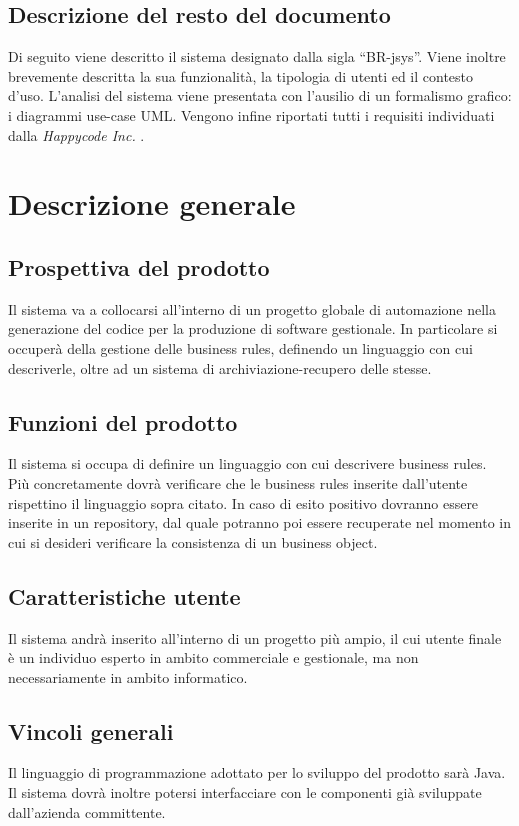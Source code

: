 \documentclass[11pt,titlepage,a4paper]{report}
\begin{document}
\section{Descrizione del resto del documento}
Di seguito viene descritto il sistema designato dalla sigla ``BR-jsys''. Viene inoltre brevemente descritta la sua funzionalit\`a, la tipologia di utenti ed il contesto d'uso. L'analisi del sistema viene presentata con l'ausilio di un formalismo grafico: i diagrammi use-case UML. Vengono infine riportati tutti i requisiti individuati dalla \textit{Happycode Inc.} .

\chapter{Descrizione generale}
\section{Prospettiva del prodotto}
Il sistema va a collocarsi all'interno di un progetto globale di automazione nella generazione del codice per la produzione di software gestionale. In particolare si occuper\`a della gestione delle business rules, definendo un linguaggio con cui descriverle, oltre ad un sistema di archiviazione-recupero delle stesse.
\section{Funzioni del prodotto}
Il sistema si occupa di definire un linguaggio con cui descrivere business rules. Pi\`u concretamente dovr\`a verificare che le business rules inserite dall'utente rispettino il linguaggio sopra citato. In caso di esito positivo dovranno essere inserite in un repository, dal quale potranno poi essere recuperate nel momento in cui si desideri verificare la consistenza di un business object.
\section{Caratteristiche utente}
Il sistema andr\`a inserito all'interno di un progetto pi\`u ampio, il cui utente finale \`e un individuo esperto in ambito commerciale e gestionale, ma non necessariamente in ambito informatico.
\section{Vincoli generali}
Il linguaggio di programmazione adottato per lo sviluppo del prodotto sar\`a Java. Il sistema dovr\`a inoltre potersi interfacciare con le componenti gi\`a sviluppate dall'azienda committente. 
\end{document}
